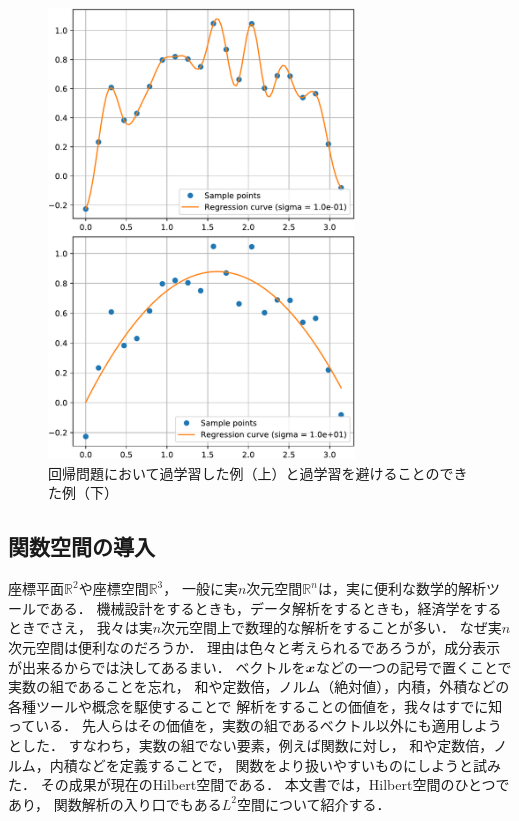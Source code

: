 \begin{figure}[t]
\centerline{\includegraphics[clip,width=230pt]{figures/overfitting.pdf}}
\caption{回帰問題において過学習した例（上）と過学習を避けることのできた例（下）}
\label{fig:overfitting}
\end{figure}


\subsection{関数空間の導入}

座標平面$\mathbb{R}^2$や座標空間$\mathbb{R}^3$，
一般に実$n$次元空間$\mathbb{R}^n$は，実に便利な数学的解析ツールである．
機械設計をするときも，データ解析をするときも，経済学をするときでさえ，
我々は実$n$次元空間上で数理的な解析をすることが多い．
なぜ実$n$次元空間は便利なのだろうか．
理由は色々と考えられるであろうが，成分表示が出来るからでは決してあるまい．
ベクトルを$\boldsymbol{x}$などの一つの記号で置くことで実数の組であることを忘れ，
和や定数倍，ノルム（絶対値），内積，外積などの各種ツールや概念を駆使することで
解析をすることの価値を，我々はすでに知っている．
先人らはその価値を，実数の組であるベクトル以外にも適用しようとした．
すなわち，実数の組でない要素，例えば関数に対し，
和や定数倍，ノルム，内積などを定義することで，
関数をより扱いやすいものにしようと試みた．
その成果が現在のHilbert空間である．
本文書では，Hilbert空間のひとつであり，
関数解析の入り口でもある$L^2$空間について紹介する．

